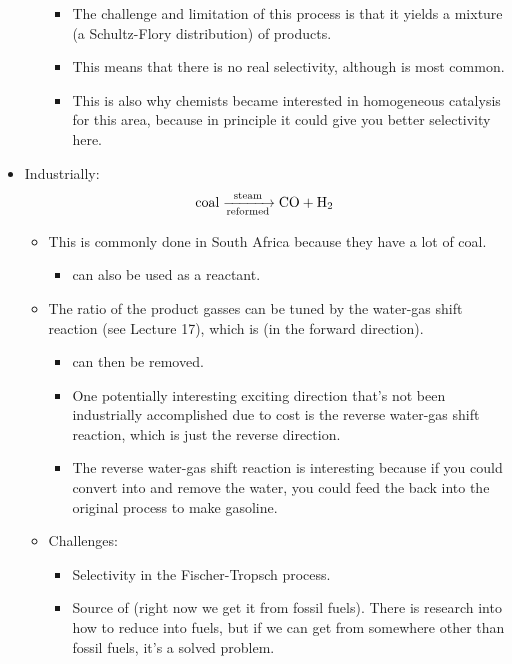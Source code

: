 \documentclass[../notes.tex]{subfiles}
\begin{document}
\begin{itemize}
\begin{itemize}
\begin{itemize}
            \item The challenge and limitation of this process is that it yields a mixture (a Schultz-Flory distribution) of products.
            \item This means that there is no real selectivity, although  is most common.
            \item This is also why chemists became interested in homogeneous catalysis for this area, because in principle it could give you better selectivity here.
        \end{itemize}
    \end{itemize}
    \item Industrially:
    \begin{equation*}
        \ce{{coal} ->[steam][reformed] CO + H2}
    \end{equation*}
    \begin{itemize}
        \item This is commonly done in South Africa because they have a lot of coal.
        \begin{itemize}
            \item {} can also be used as a reactant.
        \end{itemize}
        \item The ratio of the product gasses can be tuned by the water-gas shift reaction (see Lecture 17), which is  (in the forward direction).
        \begin{itemize}
            \item {} can then be removed.
            \item One potentially interesting exciting direction that's not been industrially accomplished due to cost is the reverse water-gas shift reaction, which is just the reverse direction.
            \item The reverse water-gas shift reaction is interesting because if you could convert  into  and remove the water, you could feed the  back into the original process to make gasoline.
        \end{itemize}
        \item Challenges:
        \begin{itemize}
            \item Selectivity in the Fischer-Tropsch process.
            \item Source of  (right now we get it from fossil fuels). There is research into how to reduce  into fuels, but if we can get  from somewhere other than fossil fuels, it's a solved problem.

\end{itemize}
\end{itemize}
\end{itemize}
\end{document}
